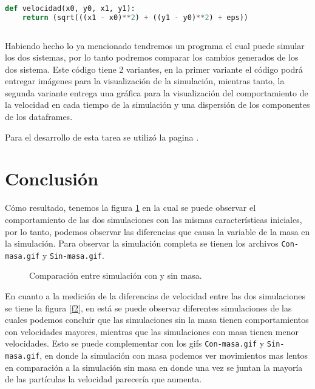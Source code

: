 \documentclass{article}
\begin{document}
  \begin{lstlisting}[language=Python]
  
def velocidad(x0, y0, x1, y1):
    return (sqrt(((x1 - x0)**2) + ((y1 - y0)**2) + eps))
    
 \end{lstlisting}

Habiendo hecho lo ya mencionado tendremos un programa el cual puede simular los dos sistemas,  por lo tanto podremos comparar los cambios generados de los dos sistema. Este código tiene 2 variantes, en la primer variante el código podrá entregar imágenes para la visualización de la simulación, mientras tanto, la segunda variante entrega una gráfica para la visualización del comportamiento de la velocidad en cada tiempo de la simulación y una dispersión de los componentes de los dataframes. 

Para el desarrollo de esta tarea se utilizó la pagina \citep{DRA.Code}.


\section{Conclusión}

Cómo resultado, tenemos la figura \ref{f1} en la cual se puede observar el comportamiento de las dos simulaciones con las mismas características iniciales, por lo tanto, podemos observar las diferencias que causa la variable de la masa en la simulación. Para observar la simulación completa se tienen los archivos \texttt{Con-masa.gif} y \texttt{Sin-masa.gif}.

\begin{figure}[H]
\centering
{}
\caption{Comparaci\'on entre simulaci\'on con y sin masa.} 
\label{f1}
\end{figure}

En cuanto a la medición de la diferencias de velocidad entre las dos simulaciones se tiene la figura \ref{f2}, en está se puede observar diferentes simulaciones de las cuales podemos concluir que las simulaciones sin la masa tienen comportamientos con velocidades mayores, mientras que las simulaciones con masa tienen menor velocidades. Esto se puede complementar con los gifs \texttt{Con-masa.gif} y \texttt{Sin-masa.gif}, en donde la simulación con masa podemos ver movimientos mas lentos en comparación a la simulación sin masa en donde una vez se juntan la mayoría de las partículas la velocidad parecería que aumenta.
\end{document}
